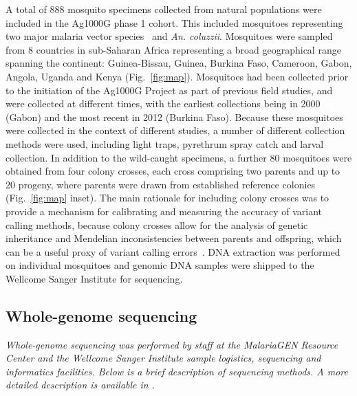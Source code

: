 \documentclass[a4paper,11pt,abstracton,hidelinks]{scrartcl}
\begin{document}
A total of 888 mosquito specimens collected from natural populations were included in the Ag1000G phase 1 cohort.
%
This included mosquitoes representing two major malaria vector species \agam\ and \textit{An. coluzzii}.
%
Mosquitoes were sampled from 8 countries in sub-Saharan Africa representing a broad geographical range spanning the continent: Guinea-Bissau, Guinea, Burkina Faso, Cameroon, Gabon, Angola, Uganda and Kenya (Fig.~\ref{fig:map}).
%
Mosquitoes had been collected prior to the initiation of the Ag1000G Project as part of previous field studies, and were collected at different times, with the earliest collections being in 2000 (Gabon) and the most recent in 2012 (Burkina Faso).
%
Because these mosquitoes were collected in the context of different studies, a number of different collection methods were used, including light traps, pyrethrum spray catch and larval collection.
%
In addition to the wild-caught specimens, a further 80 mosquitoes were obtained from four colony crosses, each cross comprising two parents and up to 20 progeny, where parents were drawn from established reference colonies (Fig.~\ref{fig:map} inset).
%
The main rationale for including colony crosses was to provide a mechanism for calibrating and measuring the accuracy of variant calling methods, because colony crosses allow for the analysis of genetic inheritance and Mendelian inconsistencies between parents and offspring, which can be a useful proxy of variant calling errors~\parencite{Saunders2007,Laurie2010,Pilipenko2014}.
%
DNA extraction was performed on individual mosquitoes and genomic DNA samples were shipped to the Wellcome Sanger Institute for sequencing.


\subsection{Whole-genome sequencing}\label{subsec:whole-genome-sequencing}


\textit{Whole-genome sequencing was performed by staff at the MalariaGEN Resource Center and the Wellcome Sanger Institute sample logistics, sequencing and informatics facilities. Below is a brief description of sequencing methods. A more detailed description is available in \textcite{Ag1000G2017}.}
\end{document}
